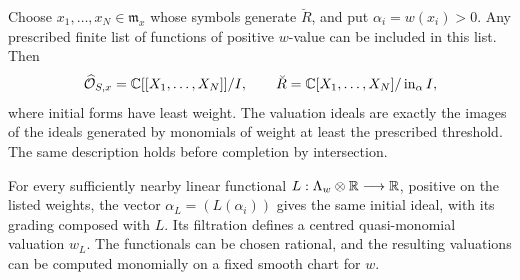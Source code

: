 \begin{lemma}\label{lem:F-presentation}
Choose $x_1,\ldots,x_N\in\mathfrak m_x$ whose symbols generate
$\breve R$, and put $\alpha_i=w(x_i)>0$.  Any prescribed finite
list of functions of positive $w$-value can be included in this list.
Then
\begin{equation}\label{eq:F-presentation}
 \widehat{\mathcal O}_{S,x}=\mathbb C[[X_1,\ldots,X_N]]/I,
 \qquad
 \breve R=\mathbb C[X_1,\ldots,X_N]/\operatorname{in}_{\alpha}I,
\end{equation}
where initial forms have least weight.  The valuation ideals are
exactly the images of the ideals generated by monomials of weight
at least the prescribed threshold.  The same description holds
before completion by intersection.

For every sufficiently nearby linear functional
$L:\Lambda_w\otimes\mathbb R\longrightarrow\mathbb R$, positive on the listed
weights, the vector $\alpha_L=(L(\alpha_i))$ gives the same initial
ideal, with its grading composed with $L$.  Its filtration defines
a centred quasi-monomial valuation $w_L$.  The functionals can be
chosen rational, and the resulting valuations can be computed
monomially on a fixed smooth chart for $w$.
\end{lemma}

